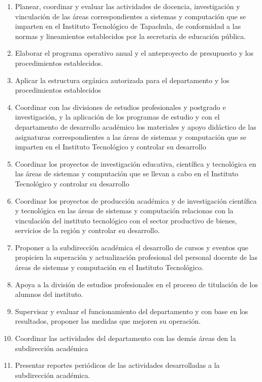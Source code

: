 {\setlength{\baselineskip}{0.8\baselineskip}
\begin{enumerate}
\item Planear, coordinar y evaluar las actividades de docencia, investigación y vinculación de las áreas correspondientes a sistemas y computación que se imparten en el Instituto Tecnológico de Tapachula, de conformidad a las normas y lineamientos establecidos por la secretaria de educación pública.

\item Elaborar el programa operativo anual y el anteproyecto de presupuesto y los procedimientos establecidos.

\item Aplicar la estructura orgánica autorizada para el departamento y los procedimientos establecidos 

\item  Coordinar con las divisiones de estudios profesionales y postgrado e investigación, y la aplicación de los programas de estudio y con el departamento de desarrollo académico los materiales y apoyo didáctico de las asignaturas correspondientes a las áreas de sistemas y computación que se imparten en el Instituto Tecnológico y controlar su desarrollo

\item Coordinar los proyectos de investigación educativa, científica y tecnológica en las áreas de sistemas y computación que se llevan a cabo en el Instituto Tecnológico y controlar su desarrollo 

\item Coordinar los proyectos de producción académica y de investigación científica y tecnológica en las áreas de sistemas y computación relacionas con la vinculación del instituto tecnológico con el sector productivo de bienes, servicios de la región y controlar su desarrollo.

\item Proponer a la subdirección académica el desarrollo de cursos y eventos que propicien la superación y actualización profesional del personal docente de las áreas de sistemas y computación en el Instituto Tecnológico.

\item Apoya a la división de estudios profesionales en el proceso de titulación de los alumnos del instituto.

\item Supervisar y evaluar el funcionamiento del departamento y con base en los resultados, proponer las medidas que mejoren su operación.

\item Coordinar las actividades del departamento con las demás áreas den la subdirección académica 

\item Presentar reportes periódicos de las actividades desarrolladas a la subdirección académica.

\end{enumerate}
}
